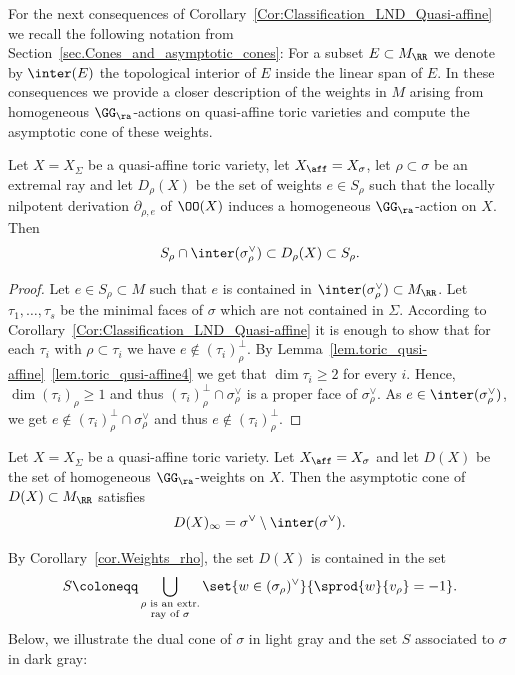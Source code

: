 For the next consequences of Corollary~\ref{Cor:Classification_LND_Quasi-affine} we recall the
following notation from Section~\ref{sec.Cones_and_asymptotic_cones}: For a
subset $E \subset M_{\RR}$ we denote by $\inter(E)$ the topological interior of $E$
inside the linear span of $E$. In these consequences we provide a closer
description of the weights in $M$ arising from homogeneous $\GG_\ra$-actions on quasi-affine toric varieties
and compute the asymptotic cone of these weights.

\begin{corollary}
\label{cor.Weights_rho}
Let $X = X_{\Sigma}$ be a quasi-affine toric variety, let $X_{\aff}=X_{\sigma}$, let
$\rho \subset \sigma$ be an extremal ray and let $D_{\rho}(X)$
be the set of weights $e \in S_\rho$ such that the locally nilpotent derivation
$\partial_{\rho, e}$ of $\OO(X)$ induces a homogeneous $\GG_\ra$-action on $X$. Then
\[
S_{\rho} \cap \inter(\sigma_{\rho}^\vee) \subset
D_{\rho}(X) \subset S_\rho.
\]
\end{corollary}

\begin{proof}
Let $e \in S_{\rho} \subset M$ such that $e$ is contained in
$\inter(\sigma_{\rho}^\vee) \subset M_{\RR}$.
Let $\tau_1, \ldots, \tau_s$ be the minimal faces of $\sigma$ which are not contained in $\Sigma$.
According to Corollary~\ref{Cor:Classification_LND_Quasi-affine} it is enough to show that for each $\tau_i$
with $\rho \subset \tau_i$ we have $e \not\in (\tau_i)_{\rho}^\bot$. By
Lemma~\ref{lem.toric_qusi-affine}~\eqref{lem.toric_qusi-affine4} we get that $\dim \tau_i \geq 2$
for every $i$. Hence, $\dim (\tau_i)_\rho \geq 1$
and thus $(\tau_i)_\rho^\bot \cap \sigma_\rho^\vee$ is a proper face of $\sigma_\rho^\vee$. As
$e \in \inter(\sigma_\rho^\vee)$, we get
$e \not\in (\tau_i)_\rho^\bot \cap \sigma_\rho^\vee$ and thus $e \not\in (\tau_i)_\rho^\bot$.
\end{proof}

\begin{corollary}
\label{cor.Weights}
Let $X = X_\Sigma$ be a quasi-affine toric variety. Let $X_{\aff} = X_{\sigma}$
and let $D(X)$ be the set of homogeneous $\GG_\ra$-weights on $X$.
Then the asymptotic cone of
$D(X) \subset M_{\RR}$ satisfies
\[
D(X)_{\infty} = \sigma^\vee \setminus \inter(\sigma^\vee).
\]
\end{corollary}

By Corollary~\ref{cor.Weights_rho}, the set $D(X)$ is contained in
the set
\[
S \coloneqq \bigcup_{\substack{
\textrm{$\rho$ is an extr.} \\
\textrm{ray of $\sigma$}
}} \set{w \in (\sigma_\rho)^\vee}{\sprod{w}{v_\rho} = -1}.
\]
Below, we illustrate the dual cone of $\sigma$ in light gray
and the set $S$ associated to $\sigma$ in dark gray:

